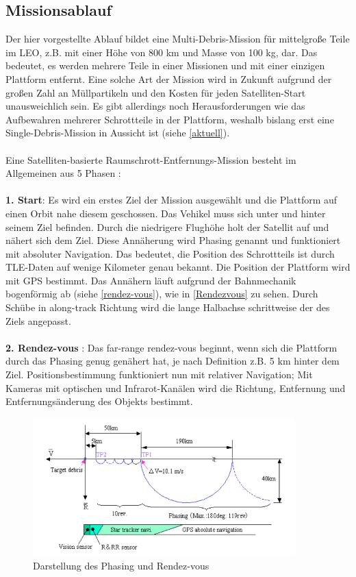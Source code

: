 \documentclass{article}
\begin{document}
\subsection{Missionsablauf}
Der hier vorgestellte Ablauf bildet eine Multi-Debris-Mission für mittelgroße Teile im LEO, z.B. mit einer Höhe von 800 km und Masse von 100 kg, dar. Das bedeutet, es werden mehrere Teile in einer Missionen und mit einer einzigen Plattform entfernt. Eine solche Art der Mission wird in Zukunft aufgrund der großen Zahl an Müllpartikeln und den Kosten für jeden Satelliten-Start unausweichlich sein. Es gibt allerdings noch Herausforderungen wie das Aufbewahren mehrerer Schrottteile in der Plattform, weshalb bislang erst eine Single-Debris-Mission in Aussicht ist (siehe \autoref{aktuell}). \\\\
Eine Satelliten-basierte Raumschrott-Entfernungs-Mission besteht im Allgemeinen aus 5 Phasen \citep{ruggiero2015small}: \\\\
\textbf{1. Start}: Es wird ein erstes Ziel der Mission ausgewählt und die Plattform auf einen Orbit nahe diesem geschossen. Das Vehikel muss sich unter und hinter seinem Ziel befinden. Durch die niedrigere Flughöhe holt der Satellit auf und nähert sich dem Ziel. Diese Annäherung wird Phasing genannt und funktioniert mit absoluter Navigation. Das bedeutet, die Position des Schrottteils ist durch TLE-Daten auf wenige Kilometer genau bekannt. Die Position der Plattform wird mit GPS bestimmt. Das Annähern läuft aufgrund der Bahnmechanik bogenförmig ab (siehe  \autoref{rendez-vous}), wie in \autoref{Rendezvous} zu sehen. Durch Schübe in along-track Richtung wird die lange Halbachse schrittweise der des Ziels angepasst. \\\\
\textbf{2. Rendez-vous} \citep{castronuovo2011active}: Das far-range rendez-vous beginnt, wenn sich die Plattform durch das Phasing genug genähert hat, je nach Definition z.B. 5 km hinter dem Ziel. Positionsbestimmung funktioniert nun mit relativer Navigation; Mit Kameras mit optischen und Infrarot-Kanälen wird die Richtung, Entfernung und Entfernungsänderung des Objekts bestimmt.\\
\begin{figure}[H]
	\centering
	\includegraphics[width = 0.9\textwidth]{bilder/Rendezvous.png}
	\caption{Darstellung des Phasing und Rendez-vous \citep{nishida2009space}}
	\label{Rendezvous}
\end{figure}
\end{document}
